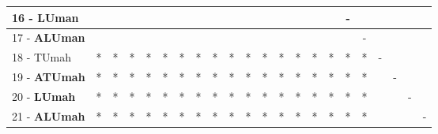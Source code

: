 \begin{table}[h]
\begin{center}
\begin{tabular}{lcc|cc|cc|cc|cc|cc|cc|cc|cc|cc|c}
16 - \textbf{LUman}	&   &   &   &   &   &   &   &   &   &   &   &   &   &   &   & - &   &   &   &   &   \\ \hline
17 - \textbf{ALUman}	&   &   &   &   &   &   &   &   &   &   &   &   &   &   &   &   & - &   &   &   &   \\
18 - TUmah	& * & * & * & * & * & * & * & * & * & * & * & * & * & * & * & * & * & - &   &   &   \\ \hline
19 - \textbf{ATUmah}	& * & * & * & * & * & * & * & * & * & * & * & * & * & * & * & * & * &   & - &   &   \\
20 - \textbf{LUmah}	& * & * & * & * & * & * & * & * & * & * & * & * & * & * & * & * & * &   &   & - &   \\ \hline
21 - \textbf{ALUmah}	& * & * & * & * & * & * & * & * & * & * & * & * & * & * & * & * & * &   &   &   & - \\\end{tabular}
\label{stratsALCKappaFriedSVM}
\end{center}
\end{table}